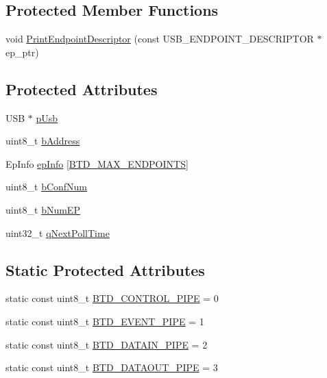 \subsection*{\-Protected \-Member \-Functions}
\begin{DoxyCompactItemize}
\item 
void \hyperlink{class_b_t_d_aa5976eead215a58553aee683d42405a0}{\-Print\-Endpoint\-Descriptor} (const \-U\-S\-B\-\_\-\-E\-N\-D\-P\-O\-I\-N\-T\-\_\-\-D\-E\-S\-C\-R\-I\-P\-T\-O\-R $\ast$ep\-\_\-ptr)
\end{DoxyCompactItemize}
\subsection*{\-Protected \-Attributes}
\begin{DoxyCompactItemize}
\item 
\-U\-S\-B $\ast$ \hyperlink{class_b_t_d_a4bcd1d622a6455ee3d0cccc4408700a1}{p\-Usb}
\item 
uint8\-\_\-t \hyperlink{class_b_t_d_a58f78a9a28db81858dcc34a32a2ec82c}{b\-Address}
\item 
\-Ep\-Info \hyperlink{class_b_t_d_a91d92fee94e5a4cbca472bb3fd883e3e}{ep\-Info} \mbox{[}\hyperlink{_b_t_d_8h_aee41c4878894db24e7ad8cd6246595cd}{\-B\-T\-D\-\_\-\-M\-A\-X\-\_\-\-E\-N\-D\-P\-O\-I\-N\-T\-S}\mbox{]}
\item 
uint8\-\_\-t \hyperlink{class_b_t_d_a10c34527ae90e95791ac48ac7d1154a2}{b\-Conf\-Num}
\item 
uint8\-\_\-t \hyperlink{class_b_t_d_a893dd35932821cddda7e482a1904af66}{b\-Num\-E\-P}
\item 
uint32\-\_\-t \hyperlink{class_b_t_d_a52d6c7895f6bb01729d01ce28a2f3079}{q\-Next\-Poll\-Time}
\end{DoxyCompactItemize}
\subsection*{\-Static \-Protected \-Attributes}
\begin{DoxyCompactItemize}
\item 
static const uint8\-\_\-t \hyperlink{class_b_t_d_a49f433ab824f259c3815e180c73bb0ad}{\-B\-T\-D\-\_\-\-C\-O\-N\-T\-R\-O\-L\-\_\-\-P\-I\-P\-E} = 0
\item 
static const uint8\-\_\-t \hyperlink{class_b_t_d_a24166c9b308925eeb2f635fae43ca5ec}{\-B\-T\-D\-\_\-\-E\-V\-E\-N\-T\-\_\-\-P\-I\-P\-E} = 1
\item 
static const uint8\-\_\-t \hyperlink{class_b_t_d_a480510bd399ae74a97cd74c8474ef59c}{\-B\-T\-D\-\_\-\-D\-A\-T\-A\-I\-N\-\_\-\-P\-I\-P\-E} = 2
\item 
static const uint8\-\_\-t \hyperlink{class_b_t_d_a0d82870f7eef8c27c33e6f5989d7a4dd}{\-B\-T\-D\-\_\-\-D\-A\-T\-A\-O\-U\-T\-\_\-\-P\-I\-P\-E} = 3
\end{DoxyCompactItemize}


